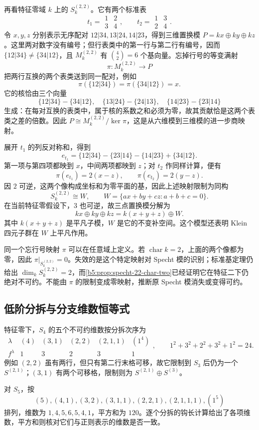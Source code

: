 \ProseParagraphBreak

再看特征零域 \(k\) 上的 \(S_k^{(2,2)}\)。它有两个标准表
\[
	t_1=\begin{array}{cc}1&2\\3&4\end{array},
	\qquad
	t_2=\begin{array}{cc}1&3\\2&4\end{array}.
\]
令 \(x,y,z\) 分别表示无序配对 \(12|34,13|24,14|23\)，得到三维置换模 \(P=kx\oplus ky\oplus kz\)。这里两对数字没有编号；但行表类中的第一行与第二行有编号，因而 \(\{12|34\}\ne\{34|12\}\)，且 \(M_k^{(2,2)}\) 有 \(\binom42=6\) 个基向量。忘掉行号的等变满射
\[
	\pi:M_k^{(2,2)}\longrightarrow P
\]
把两行互换的两个表类送到同一配对，例如
\[
	\pi(\{12|34\})=\pi(\{34|12\})=x.
\]
它的核恰由三个向量
\[
	\{12|34\}-\{34|12\},\quad \{13|24\}-\{24|13\},\quad \{14|23\}-\{23|14\}
\]
生成：在每对互换的表类中，属于核的系数之和必须为零，故其贡献恰是这两个表类之差的倍数。因此 \(P\cong M_k^{(2,2)}/\ker\pi\)，这是从六维模到三维模的进一步商映射。

\ProseParagraphBreak

展开 \(t_1\) 的列反对称和，得到
\[
	e_{t_1}=\{12|34\}-\{23|14\}-\{14|23\}+\{34|12\}.
\]
第一项与第四项都映到 \(x\)，中间两项都映到 \(z\)；对 \(t_2\) 作同样计算，便有
\[
	\pi(e_{t_1})=2(x-z),\qquad \pi(e_{t_2})=2(y-z).
\]
因 \(2\) 可逆，这两个像构成坐标和为零平面的基，因此上述映射限制为同构
\[
	S_k^{(2,2)}\cong W, \qquad W=\{ax+by+cz:a+b+c=0\}.
\]
在当前特征零假设下，\(3\) 也可逆，故三点置换模分解为
\[
	kx\oplus ky\oplus kz=k(x+y+z)\oplus W.
\]
其中 \(k(x+y+z)\) 是平凡子模，\(W\) 是它的不变补空间。这个模型还表明 Klein 四元子群在 \(W\) 上平凡作用。

\ProseParagraphBreak

同一个忘行号映射 \(\pi\) 可以在任意域上定义。若 \(\operatorname{char}k=2\)，上面的两个像都为零，因此 \(\pi|_{S_k^{(2,2)}}=0\)。失效的是这个特定映射对 Specht 模的识别；标准基定理仍给出 \(\dim_kS_k^{(2,2)}=2\)，而\cref{b5:prop:specht-22-char-two}已经证明它在特征二下仍绝对不可约。不能由 \(\pi\) 的限制变成零映射，推断原 Specht 模消失或变得可约。

\subsection{低阶分拆与分支维数恒等式}
\label{b5:subsec:0606:04}

特征零下，\(S_4\) 的五个不可约维数按分拆次序为
\[
	\begin{array}{c|ccccc}
		\lambda &(4)&(3,1)&(2,2)&(2,1,1)&(1^4)\\ \hline f^\lambda&1&3&2&3&1
	\end{array},
	\qquad 1^2+3^2+2^2+3^2+1^2=24.
\]
例如 \((2,2)\) 虽有两行，但只有第二行末格可移，故它限制到 \(S_3\) 后仍为一个 \(S^{(2,1)}\)；\((3,1)\) 有两个可移格，限制则为 \(S^{(2,1)}\oplus S^{(3)}\)。

\ProseParagraphBreak

对 \(S_5\)，按
\[
	(5),(4,1),(3,2),(3,1,1),(2,2,1),(2,1,1,1),(1^5)
\]
排列，维数为 \(1,4,5,6,5,4,1\)，平方和为 \(120\)。逐个分拆的钩长计算给出了各项维数，平方和则核对它们与正则表示的维数是否一致。
